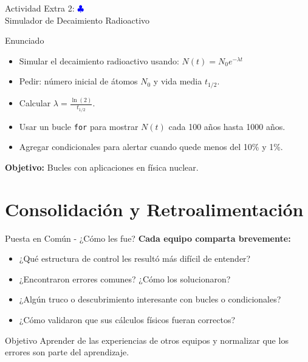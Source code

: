 \documentclass[10pt]{beamer}
\begin{document}
\begin{frame}{Actividad Extra 2: \hfill \textcolor{blue}{$\clubsuit$} \\ Simulador de Decaimiento Radioactivo}
  \begin{block}{Enunciado}
    \begin{itemize}
      \item Simular el decaimiento radioactivo usando: $N(t) = N_0 e^{-\lambda t}$
      \item Pedir: número inicial de átomos $N_0$ y vida media $t_{1/2}$.
      \item Calcular $\lambda = \frac{\ln(2)}{t_{1/2}}$.
      \item Usar un bucle \texttt{for} para mostrar $N(t)$ cada 100 años hasta 1000 años.
      \item Agregar condicionales para alertar cuando quede menos del 10\% y 1\%.
    \end{itemize}
  \end{block}
  \textbf{Objetivo:} Bucles con aplicaciones en física nuclear.
\end{frame}

\section{Consolidación y Retroalimentación}

\begin{frame}{Puesta en Común - ¿Cómo les fue?}
  \textbf{Cada equipo comparta brevemente:}
  \begin{itemize}
    \item ¿Qué estructura de control les resultó más difícil de entender?
    \item ¿Encontraron errores comunes? ¿Cómo los solucionaron?
    \item ¿Algún truco o descubrimiento interesante con bucles o condicionales?
    \item ¿Cómo validaron que sus cálculos físicos fueran correctos?
  \end{itemize}
  
  \begin{alertblock}{Objetivo}
    Aprender de las experiencias de otros equipos y normalizar que los errores son parte del aprendizaje.
  \end{alertblock}
\end{frame}
\end{document}
